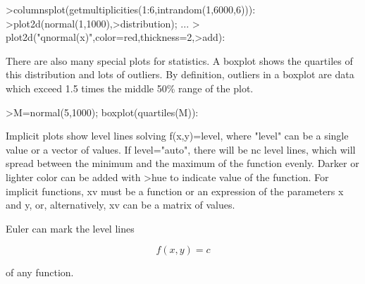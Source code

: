 \documentclass[a4paper,10pt]{article}
\begin{document}
\begin{eulernotebook}
\begin{eulercomment}
\begin{eulercomment}
\begin{eulercomment}
\begin{eulercomment}
\begin{eulerprompt}
>columnsplot(getmultiplicities(1:6,intrandom(1,6000,6))):
>plot2d(normal(1,1000),>distribution); ...
>  plot2d("qnormal(x)",color=red,thickness=2,>add):
\end{eulerprompt}
\begin{eulercomment}
There are also many special plots for statistics. A boxplot shows the quartiles of
this distribution and lots of outliers. By definition, outliers in a boxplot are data
which exceed 1.5 times the middle 50\% range of the plot.
\end{eulercomment}
\begin{eulerprompt}
>M=normal(5,1000); boxplot(quartiles(M)):
\end{eulerprompt}
\begin{eulercomment}
Implicit plots show level lines solving f(x,y)=level, where "level" can be a single
value or a vector of values. If level="auto", there will be nc level lines, which will
spread between the minimum and the maximum of the function evenly. Darker or lighter
color can be added with \textgreater{}hue to indicate value of the function. For implicit
functions, xv must be a function or an expression of the parameters x and y, or,
alternatively, xv can be a matrix of values.

Euler can mark the level lines

\end{eulercomment}
\begin{eulerformula}
\[
f(x,y) = c
\]
\end{eulerformula}
\begin{eulercomment}
of any function.


\end{eulercomment}
\end{eulercomment}
\end{eulercomment}
\end{eulercomment}
\end{eulercomment}
\end{eulernotebook}
\end{document}
